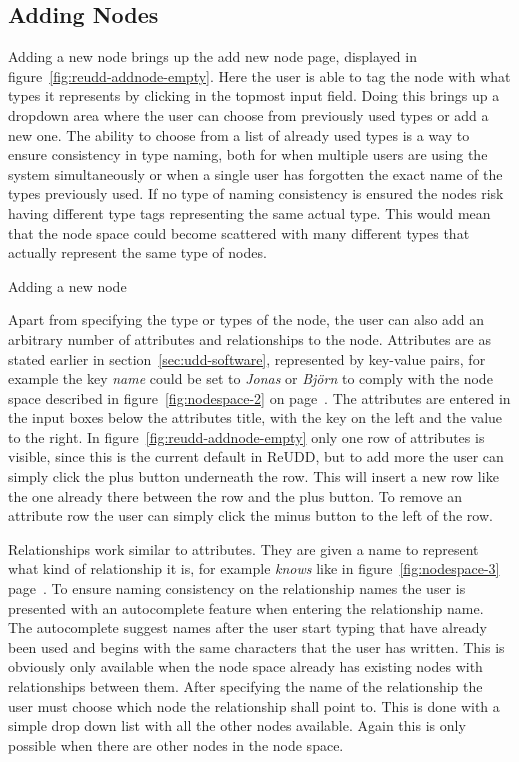 \documentclass[a4paper]{report}
\begin{document}
\subsection{Adding Nodes}

Adding a new node brings up the add new node page, displayed in figure~\ref{fig:reudd-addnode-empty}. Here the user is able to tag the node with what types it represents by clicking in the topmost input field. Doing this brings up a dropdown area where the user can choose from previously used types or add a new one. The ability to choose from a list of already used types is a way to ensure consistency in type naming, both for when multiple users are using the system simultaneously or when a single user has forgotten the exact name of the types previously used. If no type of naming consistency is ensured the nodes risk having different type tags representing the same actual type. This would mean that the node space could become scattered with many different types that actually represent the same type of nodes.

	{Adding a new node}

Apart from specifying the type or types of the node, the user can also add an arbitrary number of attributes and relationships to the node. Attributes are as stated earlier in section~\ref{sec:udd-software}, represented by key-value pairs, for example the key \emph{name} could be set to \emph{Jonas} or \emph{Björn} to comply with the node space described in figure~\ref{fig:nodespace-2} on page~\pageref{fig:nodespace-2}. The attributes are entered in the input boxes below the attributes title, with the key on the left and the value to the right. In figure~\ref{fig:reudd-addnode-empty} only one row of attributes is visible, since this is the current default in ReUDD, but to add more the user can simply click the plus button underneath the row. This will insert a new row like the one already there between the row and the plus button. To remove an attribute row the user can simply click the minus button to the left of the row.

Relationships work similar to attributes. They are given a name to represent what kind of relationship it is, for example \emph{knows} like in figure~\ref{fig:nodespace-3} page~\pageref{fig:nodespace-3}. To ensure naming consistency on the relationship names the user is presented with an autocomplete feature when entering the relationship name. The autocomplete suggest names after the user start typing that have already been used and begins with the same characters that the user has written. This is obviously only available when the node space already has existing nodes with relationships between them. After specifying the name of the relationship the user must choose which node the relationship shall point to. This is done with a simple drop down list with all the other nodes available. Again this is only possible when there are other nodes in the node space.
\end{document}
